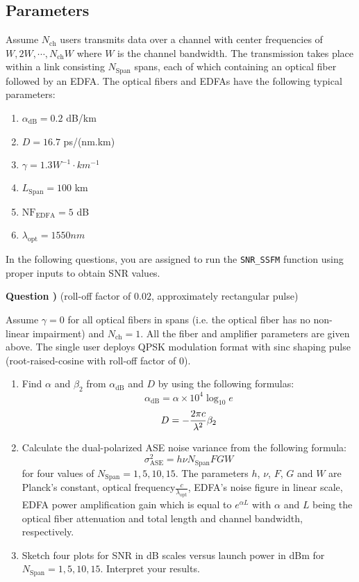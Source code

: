 \documentclass[10pt,letterpaper]{article}
\newcommand{\Span}{\text{Span}}
\newcommand{\NF}{\text{NF}}
\newcommand{\EDFA}{\text{EDFA}}
\newcommand{\ASE}{\text{ASE}}
\newcounter{QuestionNumber}
\newcommand{\Q}{
\textbf{Question \theQuestionNumber)}
\stepcounter{QuestionNumber}
}
\begin{document}
\subsection{Parameters}
Assume $N_\text{ch}$ users transmits data over a channel with center frequencies of $W,2W,\cdots, N_\text{ch}W$ where $W$ is the channel bandwidth. The transmission takes place within a link consisting $N_{\Span}$ spans, each of which containing an optical fiber followed by an EDFA. The optical fibers and EDFAs have the following typical parameters:
\begin{enumerate}
\item
$\alpha_{\text{dB}}=0.2 $ dB/km
\item
$D=16.7$ ps/(nm.km)
\item
$\gamma=1.3 W^{-1}\cdot km^{-1}$
\item
$L_\Span=100$ km
\item
$\NF_{\EDFA}=5$ dB
\item
$\lambda_\text{opt}=1550nm$
\end{enumerate}
In the following questions, you are assigned to run the \texttt{SNR\_SSFM} function using proper inputs to obtain SNR values. 

\Q (roll-off factor of $0.02$, approximately rectangular pulse) 

Assume $\gamma=0$ for all optical fibers in spans (i.e. the optical fiber has no non-linear impairment) and $N_\text{ch}=1$. All the fiber and amplifier parameters are given above. The single user deploys QPSK modulation format with sinc shaping pulse (root-raised-cosine with roll-off factor of 0).
\begin{enumerate}[label=\alph*-]
\item
Find $\alpha$ and $\beta_2$ from $\alpha_{\text{dB}}$ and $D$ by using the following formulas:
$$
\alpha_{\text{dB}}=\alpha\times 10^4\log_{10}e
$$
$$
D=-{2\pi c\over\lambda^2}\beta_2
$$
\item
Calculate the dual-polarized ASE noise variance from the following formula:
$$
\sigma^2_{\ASE}=h\nu N_{\Span} FGW
$$
for four values of $N_\Span=1,5,10,15$.
The parameters $h$, $\nu$, $F$, $G$ and $W$ are Planck's constant, optical frequency$\frac{c}{\lambda_\text{opt}}$, EDFA's noise figure in linear scale, EDFA power amplification gain which is equal to $e^{\alpha L}$ with $\alpha$ and $L$ being the optical fiber attenuation and total length and channel bandwidth, respectively.
\item
Sketch four plots for SNR in dB scales versus launch power in dBm for $N_\Span=1,5,10,15$. Interpret your results.
\end{enumerate}
\end{document}
